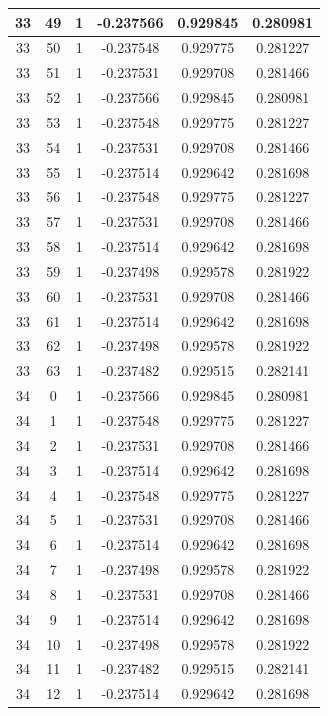 \documentclass[12pt,a4paper]{article}
\numberwithin{equation}{section}
\numberwithin{figure}{section}
\numberwithin{table}{section}
\begin{document}
\begin{longtable}{|c|c|c|c|c|c|}
33 & 49 & 1 & -0.237566 & 0.929845 & 0.280981 \\ \hline
33 & 50 & 1 & -0.237548 & 0.929775 & 0.281227 \\ \hline
33 & 51 & 1 & -0.237531 & 0.929708 & 0.281466 \\ \hline
33 & 52 & 1 & -0.237566 & 0.929845 & 0.280981 \\ \hline
33 & 53 & 1 & -0.237548 & 0.929775 & 0.281227 \\ \hline
33 & 54 & 1 & -0.237531 & 0.929708 & 0.281466 \\ \hline
33 & 55 & 1 & -0.237514 & 0.929642 & 0.281698 \\ \hline
33 & 56 & 1 & -0.237548 & 0.929775 & 0.281227 \\ \hline
33 & 57 & 1 & -0.237531 & 0.929708 & 0.281466 \\ \hline
33 & 58 & 1 & -0.237514 & 0.929642 & 0.281698 \\ \hline
33 & 59 & 1 & -0.237498 & 0.929578 & 0.281922 \\ \hline
33 & 60 & 1 & -0.237531 & 0.929708 & 0.281466 \\ \hline
33 & 61 & 1 & -0.237514 & 0.929642 & 0.281698 \\ \hline
33 & 62 & 1 & -0.237498 & 0.929578 & 0.281922 \\ \hline
33 & 63 & 1 & -0.237482 & 0.929515 & 0.282141 \\ \hline
34 & 0 & 1 & -0.237566 & 0.929845 & 0.280981 \\ \hline
34 & 1 & 1 & -0.237548 & 0.929775 & 0.281227 \\ \hline
34 & 2 & 1 & -0.237531 & 0.929708 & 0.281466 \\ \hline
34 & 3 & 1 & -0.237514 & 0.929642 & 0.281698 \\ \hline
34 & 4 & 1 & -0.237548 & 0.929775 & 0.281227 \\ \hline
34 & 5 & 1 & -0.237531 & 0.929708 & 0.281466 \\ \hline
34 & 6 & 1 & -0.237514 & 0.929642 & 0.281698 \\ \hline
34 & 7 & 1 & -0.237498 & 0.929578 & 0.281922 \\ \hline
34 & 8 & 1 & -0.237531 & 0.929708 & 0.281466 \\ \hline
34 & 9 & 1 & -0.237514 & 0.929642 & 0.281698 \\ \hline
34 & 10 & 1 & -0.237498 & 0.929578 & 0.281922 \\ \hline
34 & 11 & 1 & -0.237482 & 0.929515 & 0.282141 \\ \hline
34 & 12 & 1 & -0.237514 & 0.929642 & 0.281698 \\ \hline

\end{longtable}
\end{document}
